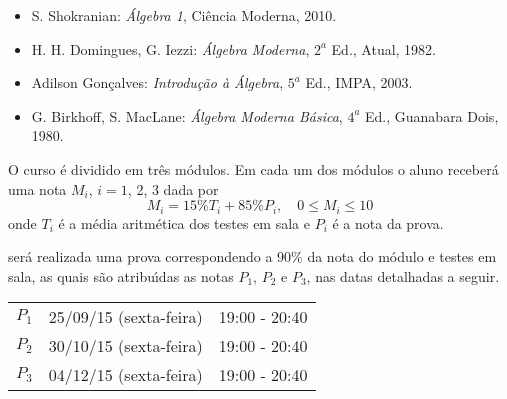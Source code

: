 \documentclass[12pt]{article}
\begin{document}
\begin{itemize}

\item S. Shokranian: {\it {\'A}lgebra 1}, Ci{\^e}ncia Moderna, 2010.

\item H. H. Domingues, G. Iezzi: {\it {\'A}lgebra Moderna}, $2^a$
  Ed., Atual, 1982.

\item Adilson Gon{\c c}alves: {\it Introdu{\c c}{\~a}o {\`a} {\'A}lgebra}, $5^a$ Ed., IMPA,
  2003.

\item G. Birkhoff, S. MacLane: {\it {\'A}lgebra Moderna B{\'a}sica}, $4^a$ Ed.,
  Guanabara Dois, 1980.

\end{itemize}

 O curso \'{e} dividido em tr\^{e}s
m\'{o}dulos.  Em cada um dos módulos o aluno receberá uma nota $M_i$, $i = 1$, 2, 3 dada por
\[
    M_i = 15\%T_i + 85\%P_i, \quad 0 \le M_i \le 10
\]
onde $T_i$  é a média aritmética dos testes em sala e $P_i$ é a nota da prova. 

 ser{\'a} realizada uma prova correspondendo a 90\% da nota do m\'odulo e testes em sala, as quais s\~{a}o atribu\'{\i}das as notas $P_1$, $P_2$ e $P_3$, nas datas detalhadas a seguir.

\begin{center}
    \begin{tabular}{c|c|c}
        \hline\hline
        \hspace{1cm}{\bf Prova}\hspace{1cm} & \hspace{3cm}{\bf Data}\hspace{3cm} & \hspace{1.7cm}{\bf Hor\'{a}rio}\hspace{1.7cm} \\
        \hline\hline
        $P_1$ & 25/09/15 (sexta-feira) \phantom{x} & 19:00 - 20:40 \\
        \hline
        $P_2$ & 30/10/15 (sexta-feira) \phantom{x} & 19:00 - 20:40 \\
        \hline
        $P_3$ & 04/12/15 (sexta-feira) \phantom{x} & 19:00 - 20:40 \\
        \hline\hline
    \end{tabular}
\end{center}
\end{document}
